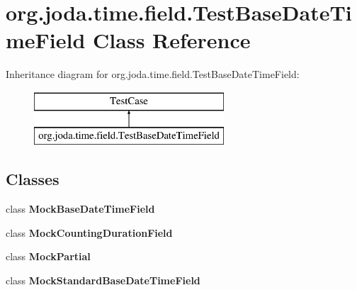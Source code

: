 \hypertarget{classorg_1_1joda_1_1time_1_1field_1_1_test_base_date_time_field}{\section{org.\-joda.\-time.\-field.\-Test\-Base\-Date\-Time\-Field Class Reference}
\label{classorg_1_1joda_1_1time_1_1field_1_1_test_base_date_time_field}
}
Inheritance diagram for org.\-joda.\-time.\-field.\-Test\-Base\-Date\-Time\-Field\-:\begin{figure}[H]
\begin{center}
\leavevmode
\includegraphics[height=2.000000cm]{classorg_1_1joda_1_1time_1_1field_1_1_test_base_date_time_field}
\end{center}
\end{figure}
\subsection*{Classes}
\begin{DoxyCompactItemize}
\item 
class {\bfseries Mock\-Base\-Date\-Time\-Field}
\item 
class {\bfseries Mock\-Counting\-Duration\-Field}
\item 
class {\bfseries Mock\-Partial}
\item 
class {\bfseries Mock\-Standard\-Base\-Date\-Time\-Field}
\end{DoxyCompactItemize}
